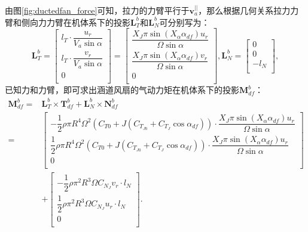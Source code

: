 由图\ref{fig:ductedfan_force}可知，拉力的力臂平行于$\bm{v}_a^{||}$，那么根据几何关系拉力力臂和侧向力力臂在机体系下的投影$\bm{L}_T^b$和$\bm{L}_N^b$可分别写为：
\begin{equation}
    \bm{L}_T^b = 
    \begin{bmatrix}
        l_T \cdot \dfrac{u_r}{V_a \sin\alpha} \\[8pt]
        l_T \cdot \dfrac{v_r}{V_a \sin\alpha} \\[8pt]
        0 \\[8pt]
    \end{bmatrix} = 
    \begin{bmatrix}
        \dfrac{X_J \pi \sin(X_\alpha \alpha_{df}) u_r}{\Omega \sin\alpha} \\[8pt]
        \dfrac{X_J \pi \sin(X_\alpha \alpha_{df}) v_r}{\Omega \sin\alpha} \\[8pt]
        0 \\[8pt]
    \end{bmatrix},
    \bm{L}_N^b = 
    \begin{bmatrix}
        0 \\[8pt]
        0 \\[8pt]
        -l_N \\[8pt]
    \end{bmatrix},
\end{equation}
已知力和力臂，即可求出涵道风扇的气动力矩在机体系下的投影$\bm{M}_{df}^b$：
\begin{equation}
    \begin{aligned}
        \bm{M}_{df}^b = &\bm{L}_T^b \times \bm{T}_{df}^b + \bm{L}_N^b \times \bm{N}_{df}^b \\
        =
        &\begin{bmatrix}
            -\dfrac{1}{2}\rho \pi R^4 \Omega^2 (C_{T0} + J (C_{T_{J0}} + C_{T_J} \cos\alpha_{df})) \cdot \dfrac{X_J \pi \sin(X_\alpha \alpha_{df}) u_r}{\Omega \sin\alpha} \\[8pt]
            \dfrac{1}{2}\rho \pi R^4 \Omega^2 (C_{T0} + J (C_{T_{J0}} + C_{T_J} \cos\alpha_{df})) \cdot \dfrac{X_J \pi \sin(X_\alpha \alpha_{df}) u_r}{\Omega \sin\alpha} \\[8pt]
            0 \\[8pt]
        \end{bmatrix} \\
        &+ \begin{bmatrix}
            - \dfrac{1}{2}\rho \pi^2 R^3 \Omega C_{N_J} v_r \cdot l_N \\[8pt]
            \dfrac{1}{2}\rho \pi^2 R^3 \Omega C_{N_J} u_r \cdot l_N \\[8pt]
            0 \\[8pt]
        \end{bmatrix}.
    \end{aligned}
\end{equation}

